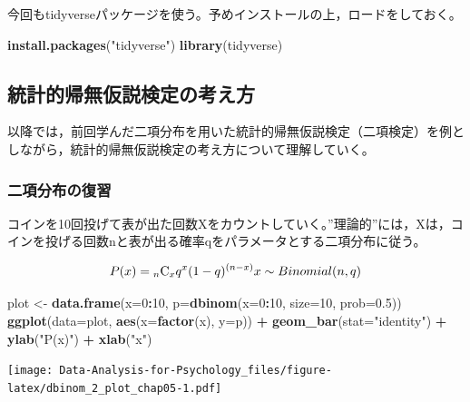 \documentclass[]{article}
\newenvironment{Shaded}{\begin{snugshade}}{\end{snugshade}}
\newcommand{\KeywordTok}[1]{\textcolor[rgb]{0.13,0.29,0.53}{\textbf{#1}}}
\newcommand{\DataTypeTok}[1]{\textcolor[rgb]{0.13,0.29,0.53}{#1}}
\newcommand{\DecValTok}[1]{\textcolor[rgb]{0.00,0.00,0.81}{#1}}
\newcommand{\FloatTok}[1]{\textcolor[rgb]{0.00,0.00,0.81}{#1}}
\newcommand{\StringTok}[1]{\textcolor[rgb]{0.31,0.60,0.02}{#1}}
\newcommand{\OperatorTok}[1]{\textcolor[rgb]{0.81,0.36,0.00}{\textbf{#1}}}
\newcommand{\NormalTok}[1]{#1}
\begin{document}
今回もtidyverseパッケージを使う。予めインストールの上，ロードをしておく。

\begin{Shaded}
\begin{Highlighting}[]
\KeywordTok{install.packages}\NormalTok{(}\StringTok{"tidyverse"}\NormalTok{)}
\KeywordTok{library}\NormalTok{(tidyverse)}
\end{Highlighting}
\end{Shaded}

\subsection{統計的帰無仮説検定の考え方}

以降では，前回学んだ二項分布を用いた統計的帰無仮説検定（二項検定）を例としながら，統計的帰無仮説検定の考え方について理解していく。

\subsubsection{二項分布の復習}

コインを10回投げて表が出た回数Xをカウントしていく。''理論的''には，Xは，コインを投げる回数nと表が出る確率qをパラメータとする二項分布に従う。

\[
P(x) = {}_n\mathrm{C}_xq^{x}(1-q)^{(n-x)}\\
x \sim Binomial(n, q)
\]

\begin{Shaded}
\begin{Highlighting}[]
\NormalTok{plot <-}\StringTok{ }\KeywordTok{data.frame}\NormalTok{(}\DataTypeTok{x=}\DecValTok{0}\OperatorTok{:}\DecValTok{10}\NormalTok{, }\DataTypeTok{p=}\KeywordTok{dbinom}\NormalTok{(}\DataTypeTok{x=}\DecValTok{0}\OperatorTok{:}\DecValTok{10}\NormalTok{, }\DataTypeTok{size=}\DecValTok{10}\NormalTok{, }\DataTypeTok{prob=}\FloatTok{0.5}\NormalTok{))}
\KeywordTok{ggplot}\NormalTok{(}\DataTypeTok{data=}\NormalTok{plot, }\KeywordTok{aes}\NormalTok{(}\DataTypeTok{x=}\KeywordTok{factor}\NormalTok{(x), }\DataTypeTok{y=}\NormalTok{p)) }\OperatorTok{+}\StringTok{ }\KeywordTok{geom_bar}\NormalTok{(}\DataTypeTok{stat=}\StringTok{"identity"}\NormalTok{) }\OperatorTok{+}\StringTok{ }\KeywordTok{ylab}\NormalTok{(}\StringTok{"P(x)"}\NormalTok{) }\OperatorTok{+}\StringTok{ }\KeywordTok{xlab}\NormalTok{(}\StringTok{"x"}\NormalTok{)}
\end{Highlighting}
\end{Shaded}

\texttt{[image: Data-Analysis-for-Psychology\_files/figure-latex/dbinom\_2\_plot\_chap05-1.pdf]}
\end{document}
